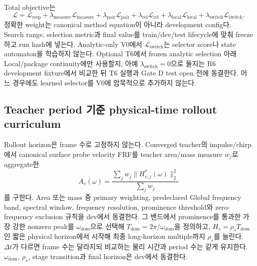 \documentclass[11pt]{article}
\begin{document}
Total objective는
\begin{equation}
  \mathcal L=\mathcal L_{\mathrm{resp}}
  +\lambda_{\mathrm{measure}}\mathcal L_{\mathrm{measure}}
  +\lambda_{\mathrm{pair}}\mathcal L_{\mathrm{pair}}
  +\lambda_{\mathrm{rel}}\mathcal L_{\mathrm{rel}}
  +\lambda_{\mathrm{local}}\mathcal L_{\mathrm{local}}
  +\lambda_{\mathrm{switch}}\mathcal L_{\mathrm{switch}}.
  \label{eq:rd-total-loss}
\end{equation}
정확한 weight는 canonical method equation이 아니라 development config다.
Search range, selection metric과 final value를 train/dev/test lifecycle에 맞춰 freeze하고 run hash에 넣는다.
Analytic-only V0에서 \(\mathcal L_{\mathrm{switch}}\)는 selector score나 state automaton을 학습하지 않는다.
Optional T6에서 frozen analytic selection 아래 Local/package continuity에만 사용할지,
아예 \(\lambda_{\mathrm{switch}}=0\)으로 둘지는 R6 development fixture에서 비교한 뒤
T6 실행과 Gate D test open 전에 동결한다.
어느 경우에도 learned selector를 V0에 암묵적으로 추가하지 않는다.

\subsection{Teacher period 기준 physical-time rollout curriculum}

Rollout horizon은 frame 수로 고정하지 않는다. Converged teacher의 impulse/chirp에서 canonical
surface probe velocity FRF를 teacher area/mass measure \(w_j\)로 aggregate한
\begin{equation}
  A_v(\omega)=\frac{\sum_j w_j\|H_{v,j}^*(\omega)\|_2^2}{\sum_jw_j}
  \label{eq:rd-teacher-period-spectrum}
\end{equation}
를 구한다. Area 또는 mass 중 primary weighting, predeclared Global frequency band,
spectral window, frequency resolution, prominence threshold와 zero-frequency exclusion 규칙을 dev에서 동결한다.
그 밴드에서 prominence를 통과한 가장 강한 nonzero peak를 \(\omega_{\mathrm{dom}}\)으로 선택해
\(T_{\mathrm{dom}}=2\pi/\omega_{\mathrm{dom}}\)을 정의하고,
\(H_s=\rho_sT_{\mathrm{dom}}\)인 짧은 physical horizon에서 시작해 최종 long-horizon multiple까지
\(\rho_s\)를 늘린다. \(\Delta t\)가 다르면 frame 수는 달라지되 비교하는 물리 시간과 period 수는
같게 유지한다. \(\omega_{\mathrm{dom}}\), \(\rho_s\), stage transition과 final horizon은 dev에서 동결한다.
\end{document}
